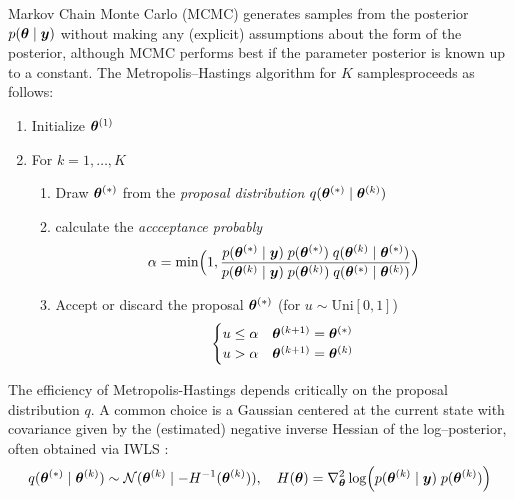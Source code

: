Markov Chain Monte Carlo (MCMC) generates samples from the posterior $p(\bm{\theta}\mid \bm{y})$ without making any (explicit) assumptions about the form of the posterior, although MCMC performs best if the parameter posterior is known up to a constant.
The Metropolis–Hastings algorithm \citep{hastings_monte_1970} for $K$ samples\footnotemark proceeds as follows:
\begin{enumerate}
    \item Initialize $\bm{\theta}^{(1)}$
    \item For $k = 1, \dots, K$
    \begin{enumerate}
        \item Draw $\bm{\theta}^{(*)}$ from the \textit{proposal distribution} $q(\bm{\theta}^{(*)} \mid \bm{\theta}^{(k)})$
        \item calculate the \textit{accceptance probably} 
            \begin{equation*}
                \alpha = \min \Bigl(
                    1, \frac{
                        p(\bm{\theta}^{(*)} \mid \bm{y})\; p(\bm{\theta}^{(*)}) \; q(\bm{\theta}^{(k)} \mid \bm{\theta}^{(*)})}{
                            p(\bm{\theta}^{(k)} \mid \bm{y})\; p(\bm{\theta}^{(k)}) \; q(\bm{\theta}^{(*)} \mid \bm{\theta}^{(k)})
                        }
                    \Bigr)
            \end{equation*}
        \item Accept or discard the proposal $\bm{\theta}^{(*)}$ (for $u \sim \text{Uni}[0, 1]$)
            \begin{equation*}
                \begin{cases}
                    u \le \alpha & \bm{\theta}^{(k+1)} = \bm{\theta}^{(*)}\\
                    u > \alpha & \bm{\theta}^{(k+1)} = \bm{\theta}^{(k)}\\
                \end{cases}
            \end{equation*}
    \end{enumerate}
\end{enumerate}

The efficiency of Metropolis-Hastings depends critically on the proposal distribution $q$.
A common choice is a Gaussian centered at the current state with covariance given by the (estimated) negative inverse Hessian of the log–posterior, often obtained via IWLS \citep{gamerman_markov_1998,lenk_bayesian_2000,scott_data_2011}:\footnotemark
\begin{equation*}
    q(\bm{\theta}^{(*)} \mid \bm{\theta}^{(k)}) \sim \mathcal{N}(\bm{\theta}^{(k)} \mid -H^{-1}(\bm{\theta}^{(k)})), \quad H(\bm{\theta}) = \nabla_{\bm{\theta}}^2  \log \Bigl(p(\bm{\theta}^{(k)} \mid \bm{y})\; p(\bm{\theta}^{(k)})\Bigr)
\end{equation*}

